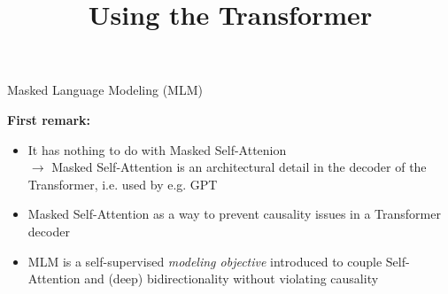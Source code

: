 



\newcommand{\titlefigure}{figure/bert.jpeg}
\newcommand{\learninggoals}{
\item Understand the two pre-training tasks
\item Learn how samples are constructed
\item Understand the pre-training process}

\title{Using the Transformer}
\date{}




\begin{frame}{Masked Language Modeling (MLM)}

\vfill

\textbf{First remark:}

\begin{itemize}
	\item It has nothing to do with Masked Self-Attenion\\ 
				$\rightarrow$ Masked Self-Attention is an architectural detail in the decoder of the Transformer, i.e. used by e.g. GPT
	\item Masked Self-Attention as a way to prevent causality issues in a Transformer decoder
	\item MLM is a self-supervised \textit{modeling objective} introduced to couple Self-Attention and (deep) bidirectionality without violating causality
\end{itemize}

\vfill

\end{frame}


